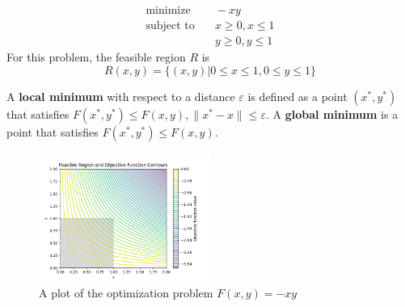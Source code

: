 \begin{align}
  \text{minimize} & \quad -xy \\
  \text{subject to} & \quad x \geq 0, x \leq 1 \\
  & \quad y \geq 0, y \leq 1
\end{align}
For this problem, the feasible region $R$ is
\begin{equation}
    R(x,y) = \{ ( x, y ) | 0 \leq x \leq 1, 0 \leq y \leq 1  \}
\end{equation}

A \textbf{local minimum} with respect to a distance $\varepsilon$ is defined as a point $(x^*, y^*)$ that satisfies $ F(x^*, y^*) \leq F(x,y), \| x^* - x \| \leq \varepsilon$. A \textbf{global minimum} is a point that satisfies $ F(x^*, y^*) \leq F(x,y)$.

\begin{figure}[htbp]
  \centerline{\includegraphics[width=0.50\textwidth]{chapters/01142025_feasible_region.png}}
  \caption{A plot of the optimization problem $F(x,y) = -xy$}
  \label{fig:01142025_feasible_region}
\end{figure}
